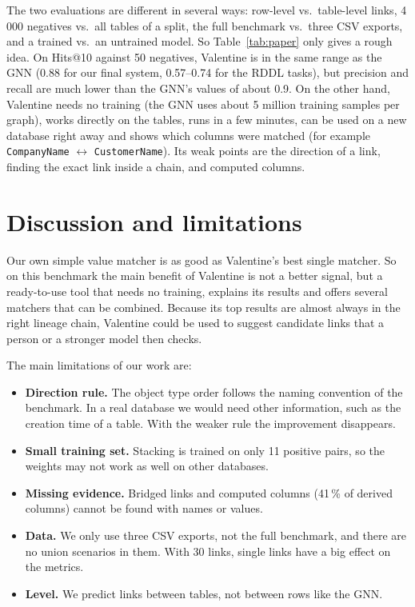 \documentclass[11pt,a4paper]{article}
\begin{document}
The two evaluations are different in several ways: row-level vs.\ table-level links, 4\,000 negatives vs.\ all
tables of a split, the full benchmark vs.\ three CSV exports, and a trained vs.\ an untrained model. So
Table~\ref{tab:paper} only gives a rough idea. On Hits@10 against 50 negatives, Valentine is in the same range as
the GNN (0.88 for our final system, 0.57--0.74 for the RDDL tasks), but precision and recall are much lower than
the GNN's values of about 0.9. On the other hand, Valentine needs no training (the GNN uses about 5 million
training samples per graph), works directly on the tables, runs in a few minutes, can be used on a new database
right away and shows which columns were matched (for example \texttt{CompanyName} $\leftrightarrow$
\texttt{CustomerName}). Its weak points are the direction of a link, finding the exact link inside a chain, and
computed columns.

\section{Discussion and limitations}\label{sec:discussion}

Our own simple value matcher is as good as Valentine's best single matcher. So on this benchmark the main benefit
of Valentine is not a better signal, but a ready-to-use tool that needs no training, explains its results and offers
several matchers that can be combined. Because its top results are almost always in the right lineage chain,
Valentine could be used to suggest candidate links that a person or a stronger model then checks.

The main limitations of our work are:
\begin{itemize}
  \item \textbf{Direction rule.} The object type order follows the naming convention of the benchmark. In a real
        database we would need other information, such as the creation time of a table. With the weaker rule the
        improvement disappears.
  \item \textbf{Small training set.} Stacking is trained on only 11 positive pairs, so the weights may not work as
        well on other databases.
  \item \textbf{Missing evidence.} Bridged links and computed columns (41\,\% of derived columns) cannot be found
        with names or values.
  \item \textbf{Data.} We only use three CSV exports, not the full benchmark, and there are no union scenarios in
        them. With 30 links, single links have a big effect on the metrics.
  \item \textbf{Level.} We predict links between tables, not between rows like the GNN.
\end{itemize}
\end{document}
